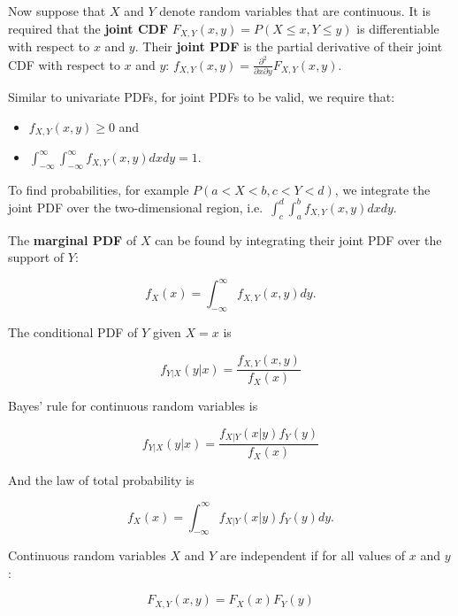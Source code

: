\documentclass[
]{book}
\providecommand{\tightlist}{%
  \setlength{\itemsep}{0pt}\setlength{\parskip}{0pt}}
\begin{document}
Now suppose that \(X\) and \(Y\) denote random variables that are continuous. It is required that the \textbf{joint CDF} \(F_{X,Y}(x,y) = P(X \leq x, Y \leq y)\) is differentiable with respect to \(x\) and \(y\). Their \textbf{joint PDF} is the partial derivative of their joint CDF with respect to \(x\) and \(y\): \(f_{X,Y}(x,y) = \frac{\partial^2}{\partial x \partial y} F_{X,Y}(x,y)\).

Similar to univariate PDFs, for joint PDFs to be valid, we require that:

\begin{itemize}
\tightlist
\item
  \(f_{X,Y}(x,y) \geq 0\) and
\item
  \(\int_{-\infty}^\infty \int_{-\infty}^\infty f_{X,Y}(x,y) dx dy = 1\).
\end{itemize}

To find probabilities, for example \(P(a<X<b, c<Y<d)\), we integrate the joint PDF over the two-dimensional region, i.e.~\(\int_{c}^d \int_{a}^b f_{X,Y}(x,y) dx dy\).

The \textbf{marginal PDF} of \(X\) can be found by integrating their joint PDF over the support of \(Y\):

\begin{equation} 
f_X(x) = \int_{-\infty}^\infty f_{X,Y}(x,y) dy.
\label{eq:5-margPDF}
\end{equation}

The conditional PDF of \(Y\) given \(X=x\) is

\begin{equation} 
f_{Y|X}(y|x) = \frac{f_{X,Y}(x,y)}{f_X(x)}
\label{eq:5-condPDF}
\end{equation}

Bayes' rule for continuous random variables is

\begin{equation} 
f_{Y|X}(y|x) = \frac{f_{X|Y}(x|y) f_Y(y)}{f_X(x)}
\label{eq:5-condPDFbayes}
\end{equation}

And the law of total probability is

\begin{equation} 
f_X(x) = \int_{-\infty}^\infty f_{X|Y}(x|y) f_Y(y) dy.
\label{eq:5-condPDFtotal}
\end{equation}

Continuous random variables \(X\) and \(Y\) are independent if for all values of \(x\) and \(y\):

\begin{equation} 
F_{X,Y} (x,y) = F_X(x) F_Y(y)
\label{eq:5-indcont1}
\end{equation}
\end{document}
